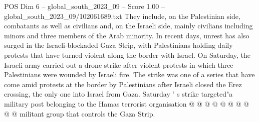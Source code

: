 \begin{textsample}{POS Dim 6 – global\_south\_2023\_09 – Score 1.00 – global\_south\_2023\_09/102061689.txt}
They include, on the Palestinian side, combatants as well as civilians and, on the Israeli side, mainly civilians including minors and three members of the Arab minority.
In recent days, unrest has also surged in the Israeli-blockaded Gaza Strip, with Palestinians holding daily protests that have turned violent along the border with Israel.
On Saturday, the Israeli army carried out a drone strike after violent protests in which three Palestinians were wounded by Israeli fire.
The strike was one of a series that have come amid protests at the border by Palestinians after Israeli closed the Erez crossing, the only one into Israel from Gaza.
Saturday ' s strike targeted"a military post belonging to the Hamas terrorist organisation @ @ @ @ @ @ @ @ @ @ militant group that controls the Gaza Strip.

\end{textsample}

